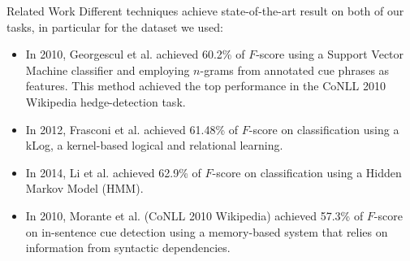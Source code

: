 \documentclass{beamer}
\begin{document}
\begin{frame}{Related Work}
	Different techniques achieve state-of-the-art result on both of our tasks, in particular for the dataset we used:
	\begin{itemize}\setlength\itemsep{1em}
		\item In 2010, Georgescul et al. achieved 60.2\% of $F$-score using a 	Support Vector Machine classifier and employing $n$-grams from annotated cue phrases as features. This method achieved the top performance in the CoNLL 2010 Wikipedia hedge-detection task.
		\item In 2012, Frasconi et al. achieved 61.48\% of $F$-score on classification using a kLog, a kernel-based logical and relational learning.
		\item In 2014, Li et al. achieved 62.9\% of $F$-score on classification using a Hidden Markov Model (HMM).
		\item In 2010, Morante et al. (CoNLL 2010 Wikipedia) achieved 57.3\% of $F$-score on in-sentence cue detection using a memory-based system that relies on information from syntactic dependencies.
	\end{itemize}

\end{frame}
\end{document}
